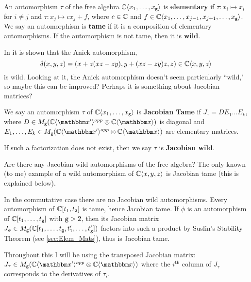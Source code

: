 An automorphism $\tau$ of the free algebra $\mathbb{C}\langle x_1,\dots, x_{\texttt{g}} \rangle$ is {\bf elementary} if $\tau:x_i \mapsto x_i$ 
	for $i\neq j$ and $\tau:x_j \mapsto cx_j + f$, where $c\in \mathbb{C}$ and $f\in \mathbb{C}\langle x_1,\dots, x_{j-1}, x_{j+1},\dots, x_{\texttt{g}} \rangle$.
We say an automorphism is {\bf tame} if it is a composition of elementary automorphisms.
If the automorphism is not tame, then it is {\bf wild}.

In \cite{JacTame-U07} it is shown that the Anick automorphism, 
\[
	\delta(x,y,z) = (x + z(xz - zy), y + (xz - zy)z, z)\in \mathbb{C}\langle x,y,z \rangle
\]
is wild.
Looking at it, the Anick automorphism doesn't seem particularly ``wild," so maybe this can be improved?
Perhaps it is something about Jacobian matrices?

\begin{definition}
	We say an automorphism $\tau$ of $\mathbb{C}\langle x_1,\dots, x_{\texttt{g}} \rangle$ is \textbf{Jacobian Tame} if
	$J_\tau = DE_1\dots E_k$, where $D\in M_\ttg(\C\fralg{\bbx'}^{opp}\otimes \C\fralg{\bbx})$ is diagonal and
	$E_1,\dots, E_k\in M_\ttg(\C\fralg{\bbx'}^{opp}\otimes \C\fralg{\bbx})$ are elementary matrices.
	
	If such a factorization does not exist, then we say $\tau$ is \textbf{Jacobian wild}.
\end{definition}


\begin{problem}
	Are there any Jacobian wild automorphisms of the free algebra?
	The only known (to me) example of a wild automorphism of $\mathbb{C}\langle x,y,z \rangle$ is Jacobian tame (this is explained below).
	
	In the commutative case there are no Jacobian wild automorphisms.
	Every automorphism of $\mathbb{C}[t_1,t_2]$ is tame, hence Jacobian tame.
	If $\phi$ is an automorphism of $\mathbb{C}[t_1,\dots, t_{\texttt{g}}]$ with ${\texttt{g}}>2$, then its Jacobian matrix
	$J_\phi\in M_{\texttt{g}}(\mathbb{C}[t_1,\dots, t_{\texttt{g}},t_1',\dots,t_{\texttt{g}}'])$ factors into such a product by Suslin's Stability Theorem (see \ref{sec:Elem_Mats}), thus is Jacobian tame.
\end{problem}

Throughout this I will be using the transposed Jacobian matrix: $J_\tau \in M_\ttg(\C\fralg{\bbx'}^{opp}\otimes \C\fralg{\bbx})$ where the 	
	$i^\text{th}$ column of $J_\tau$ corresponds to the derivatives of $\tau_i$.

